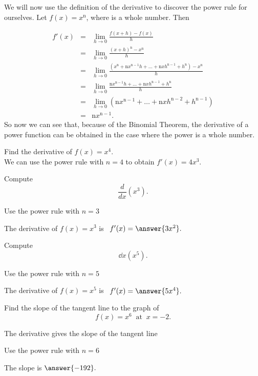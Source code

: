 \documentclass{ximera}
\begin{document}
We will now use the definition of the derivative to discover the power rule for ourselves. 
Let $f(x) = x^\text{n}$, where  is a whole number. Then

\begin{eqnarray*}
f'(x) &=& \lim_{h\to 0} \frac{f(x+h)-f(x)}{h}\\[10 pt] 
&=& \lim_{h\to 0} \frac{(x+h)^\text{n}-x^\text{n}}{h}\\[10 pt]
&=& \lim_{h\to 0} \frac{\left(x^\text{n} + \text{n}x^{\text{n}-1}h + \dots + \text{n}xh^{\text{n}-1} + h^\text{n}\right)-x^\text{n}}{h}\\[10 pt]
 &=& \lim_{h\to 0} \frac{\text{n}x^{\text{n}-1}h + \dots + \text{n}xh^{\text{n}-1} + h^\text{n}}{h} \\[10 pt]
 &=& \lim_{h\to 0} \left(\text{n}x^{\text{n}-1} + \dots + \text{n}xh^{\text{n}-2} + h^{\text{n}-1}\right) \\[10 pt] 
 &=& \text{n}x^{\text{n}-1}.
 \end{eqnarray*}
 So now we can see that, because of the Binomial Theorem, the derivative of a power function can be obtained in the case where the power is a whole number.



\begin{example} %
Find the derivative of  $f(x) = x^4$.\\
We can use the power rule with $n = 4$ to obtain $f'(x) = 4x^3.$
\end{example}


\begin{problem}
Compute
\[
\frac{d}{dx} \left(x^3\right).
\]
\begin{hint}
Use the power rule with $n = 3$
\end{hint}
\begin{prompt}
The derivative of $f(x) = x^3$ is \ $f'(x) = \answer{3x^2}.$
\end{prompt}
\end{problem}


\begin{problem}
Compute
\[
\dd{x} \left(x^5\right).
\]
\begin{hint}
Use the power rule with $n = 5$
\end{hint}
The derivative of $f(x) = x^5$ is \ $f'(x) = \answer{5x^4}.$
\end{problem}

\begin{problem}
Find the slope of the tangent line to the graph of 
\[
f(x) = x^6  \;\; \text{at} \;\; x = -2.
\]


\begin{hint}
The derivative gives the slope of the tangent line
\end{hint}
\begin{hint}
Use the power rule with $n = 6$
\end{hint}
The slope is  $\answer{-192}.$
\end{problem}
\end{document}
